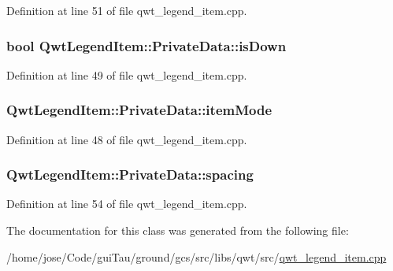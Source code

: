 Definition at line 51 of file qwt\-\_\-legend\-\_\-item.\-cpp.

\hypertarget{class_qwt_legend_item_1_1_private_data_a09c3f53bf03eb09411c0ca4c521bfa57}{
\subsubsection[{is\-Down}]{\setlength{\rightskip}{0pt plus 5cm}bool Qwt\-Legend\-Item\-::\-Private\-Data\-::is\-Down}}\label{class_qwt_legend_item_1_1_private_data_a09c3f53bf03eb09411c0ca4c521bfa57}


Definition at line 49 of file qwt\-\_\-legend\-\_\-item.\-cpp.

\hypertarget{class_qwt_legend_item_1_1_private_data_a307ed22bad69cf577a3dd2412cb17490}{
\subsubsection[{item\-Mode}]{ Qwt\-Legend\-Item\-::\-Private\-Data\-::item\-Mode}}\label{class_qwt_legend_item_1_1_private_data_a307ed22bad69cf577a3dd2412cb17490}


Definition at line 48 of file qwt\-\_\-legend\-\_\-item.\-cpp.

\hypertarget{class_qwt_legend_item_1_1_private_data_aa874d4c42203a7c092be4dc3412ba546}{
\subsubsection[{spacing}]{ Qwt\-Legend\-Item\-::\-Private\-Data\-::spacing}}\label{class_qwt_legend_item_1_1_private_data_aa874d4c42203a7c092be4dc3412ba546}


Definition at line 54 of file qwt\-\_\-legend\-\_\-item.\-cpp.



The documentation for this class was generated from the following file\-:\begin{DoxyCompactItemize}
\item 
/home/jose/\-Code/gui\-Tau/ground/gcs/src/libs/qwt/src/\hyperlink{qwt__legend__item_8cpp}{qwt\-\_\-legend\-\_\-item.\-cpp}\end{DoxyCompactItemize}

